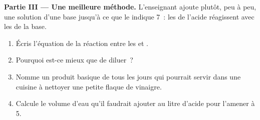 \begin{problem}
\medskip
\noindent\textbf{Partie III --- Une meilleure méthode.}
L'enseignant ajoute plutôt, peu à peu, une solution d'une base jusqu'à
ce que le  indique 7~: les   de l'acide réagissent
avec les   de la base.
\begin{enumerate}[resume]
  \item Écris l'équation de la réaction entre les   et
        .
  \item Pourquoi est-ce mieux que de diluer~?
  \item Nomme un produit basique de tous les jours qui pourrait servir
        dans une cuisine à nettoyer une petite flaque de vinaigre.
  \item Calcule le volume d'eau qu'il faudrait ajouter au litre d'acide
        pour l'amener à  5.
\end{enumerate}
\end{problem}

